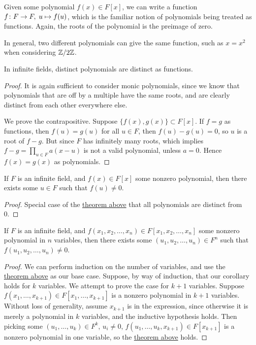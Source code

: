 \begin{definition}
    Given some polynomial \(f(x) \in F[x]\),
    we can write a function \(f\colon F\to F,\;u\mapsto f(u)\),
    which is the familiar notion of polynomials being treated as functions.
    Again, the roots of the polynomial is the preimage of zero.
\end{definition}
\begin{remark}
    In general, two different polynomials can give the same function,
    such as \(x = x^2\) when considering \(\mathbb{Z}/2\mathbb{Z}\).
\end{remark}
\begin{theorem}\label{thm:polynomial-distinct-func}
    In infinite fields, distinct polynomials are distinct as functions.
\end{theorem}
\begin{proof}
    It is again sufficient to consider monic polynomials,
    since we know that polynomials that are off by a multiple
    have the same roots,
    and are clearly distinct from each other everywhere else.

    We prove the contrapositive.
    Suppose \(\{f(x),g(x)\} \subset F[x]\).
    If \(f = g\) as functions, then \(f(u) = g(u)\) for all \(u \in F\),
    then \(f(u) - g(u) = 0\), so \(u\) is a root of \(f - g\).
    But since \(F\) has infinitely many roots,
    which implies \(f - g = \prod_{u \in F} a(x-u)\) is not a valid polynomial,
    unless \(a = 0\).
    Hence \(f(x) = g(x)\) as polynomials.
\end{proof}
\begin{corollary}
    If \(F\) is an infinite field,
    and \(f(x) \in F[x]\) some nonzero polynomial,
    then there exists some \(u \in F\) such that \(f(u) \neq 0\).
\end{corollary}
\begin{proof}
    Special case of the \hyperref[thm:polynomial-distinct-func]{theorem above}
    that all polynomials are distinct from 0.
\end{proof}
\begin{corollary}\label{cor:infinite-field-nonzero}
    If \(F\) is an infinite field,
    and \(f(x_1,x_2,\hdots,x_n) \in F[x_1,x_2,\hdots,x_n]\)
    some nonzero polynomial in \(n\) variables,
    then there exists some \((u_1,u_2,\hdots,u_n) \in F^n\)
    such that \(f(u_1,u_2,\hdots,u_n) \neq 0\).
\end{corollary}
\begin{proof}
    We can perform induction on the number of variables,
    and use the \hyperref[thm:polynomial-distinct-func]{theorem above}
    as our base case.
    Suppose, by way of induction, that our corollary holds for \(k\) variables.
    We attempt to prove the case for \(k+1\) variables.
    Suppose \(f(x_1,\hdots,x_{k+1}) \in F[x_1,\hdots,x_{k+1}]\)
    is a nonzero polynomial in \(k+1\) variables.
    Without loss of generality, assume \(x_{k+1}\) is in the expression,
    since otherwise it is merely a polynomial in \(k\) variables,
    and the inductive hypothesis holds.
    Then picking some \((u_1,\hdots,u_k) \in F^k\), \(u_i \neq 0\),
    \(f(u_1,\hdots,u_k,x_{k+1}) \in F[x_{k+1}]\)
    is a nonzero polynomial in one variable,
    so the \hyperref[thm:polynomial-distinct-func]{theorem above} holds.
\end{proof}
